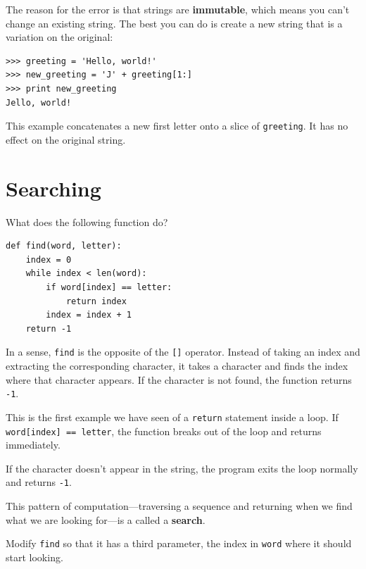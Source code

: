 \documentclass[10pt]{book}
\begin{document}

The reason for the error is that
strings are {\bf immutable}, which means you can't change an
existing string.  The best you can do is create a new string
that is a variation on the original:

\beforeverb
\begin{verbatim}
>>> greeting = 'Hello, world!'
>>> new_greeting = 'J' + greeting[1:]
>>> print new_greeting
Jello, world!
\end{verbatim}
\afterverb
%
This example concatenates a new first letter onto
a slice of {\tt greeting}.  It has no effect on
the original string.



\section{Searching}
\label{find}

What does the following function do?


\beforeverb
\begin{verbatim}
def find(word, letter):
    index = 0
    while index < len(word):
        if word[index] == letter:
            return index
        index = index + 1
    return -1
\end{verbatim}
\afterverb
%
In a sense, {\tt find} is the opposite of the {\tt []} operator.
Instead of taking an index and extracting the corresponding character,
it takes a character and finds the index where that character
appears.  If the character is not found, the function returns {\tt
-1}.

This is the first example we have seen of a {\tt return} statement
inside a loop.  If {\tt word[index] == letter}, the function breaks
out of the loop and returns immediately.

If the character doesn't appear in the string, the program
exits the loop normally and  returns {\tt -1}.

This pattern of computation---traversing a sequence and returning
when we find what we are looking for---is a called a {\bf search}.


\begin{ex}
Modify {\tt find} so that it has a
third parameter, the index in {\tt word} where it should start
looking.
\end{ex}
\end{document}
